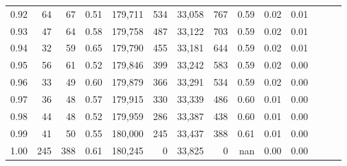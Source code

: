 \begin{tabular}{rrrrrrrrrrrrrr}
0.92 &     64 &   67 &  0.51 &  179,711 &      534 &  33,058 &     767 &  0.59 &  0.02 &      0.01 \\
0.93 &     47 &   64 &  0.58 &  179,758 &      487 &  33,122 &     703 &  0.59 &  0.02 &      0.01 \\
0.94 &     32 &   59 &  0.65 &  179,790 &      455 &  33,181 &     644 &  0.59 &  0.02 &      0.01 \\
0.95 &     56 &   61 &  0.52 &  179,846 &      399 &  33,242 &     583 &  0.59 &  0.02 &      0.00 \\
0.96 &     33 &   49 &  0.60 &  179,879 &      366 &  33,291 &     534 &  0.59 &  0.02 &      0.00 \\
0.97 &     36 &   48 &  0.57 &  179,915 &      330 &  33,339 &     486 &  0.60 &  0.01 &      0.00 \\
0.98 &     44 &   48 &  0.52 &  179,959 &      286 &  33,387 &     438 &  0.60 &  0.01 &      0.00 \\
0.99 &     41 &   50 &  0.55 &  180,000 &      245 &  33,437 &     388 &  0.61 &  0.01 &      0.00 \\
1.00 &    245 &  388 &  0.61 &  180,245 &        0 &  33,825 &       0 &   nan &  0.00 &      0.00 \\
\bottomrule
\end{tabular}
